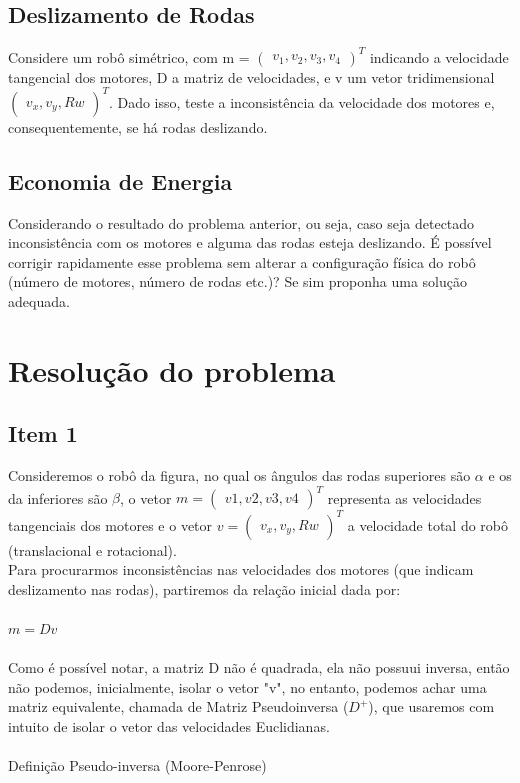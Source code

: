 \documentclass{article}
\begin{document}
\subsection{Deslizamento de Rodas}

Considere um robô simétrico, com m = $\begin{pmatrix}v_{1},v_{2},v_{3},v_{4} \end{pmatrix}^T$ indicando a velocidade tangencial dos motores,
D a matriz de velocidades, e v um vetor tridimensional $\begin{pmatrix} v_{x},v_{y},Rw \end{pmatrix}^T$.
Dado isso, teste a inconsistência da velocidade dos motores e, consequentemente, se há rodas deslizando.

\subsection{Economia de Energia}

Considerando o resultado do problema anterior, ou seja, caso seja detectado inconsistência com os motores e alguma das rodas esteja deslizando.
É possível corrigir rapidamente esse problema sem alterar a configuração física do robô (número de motores, número de rodas etc.)? Se sim proponha uma solução adequada.

\section{Resolução do problema}
\subsection{Item 1}

Consideremos o robô da figura, no qual os ângulos das rodas superiores são $\alpha$ e os da inferiores são $\beta$, o vetor $m = \begin{pmatrix} v1,v2,v3,v4 \end{pmatrix}^T$ representa
as velocidades tangenciais dos motores e o vetor $v = \begin{pmatrix} v_{x},v_{y},Rw \end{pmatrix}^T$ a velocidade total do robô (translacional e rotacional).
\\ Para procurarmos inconsistências nas velocidades dos motores (que indicam deslizamento nas rodas), partiremos da relação inicial dada por:
\\ \\ $m = Dv$ \\ \\
Como é possível notar, a matriz D não é quadrada, ela não possuui inversa, então não podemos, inicialmente, isolar o vetor "v", no entanto, podemos achar uma matriz equivalente, chamada de Matriz Pseudoinversa ($D^+$), que usaremos com intuito de isolar o vetor das velocidades Euclidianas.
\\ \\ Definição Pseudo-inversa (Moore-Penrose)
\end{document}
